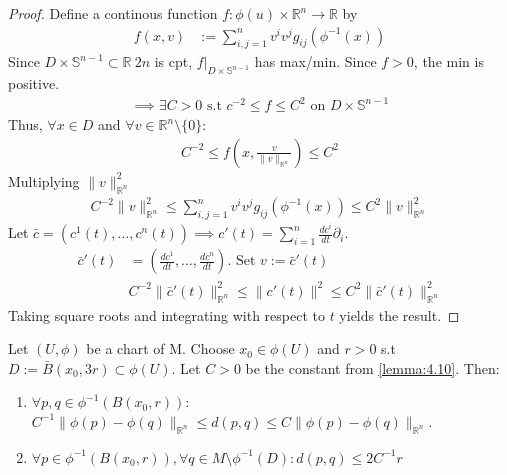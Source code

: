 \begin{proof}
    Define a continous function $f: \phi(u) \times \mathbb{R}^n \rightarrow \mathbb{R}$ by
    \[
    \begin{aligned}
        f(x,v) &:= \sum_{i,j = 1}^n v^i v^j g_{ij} (\phi^{-1}(x))
    \end{aligned}
    \]
    Since $D\times \mathbb{S}^{n-1} \subset \mathbb{R}~{2n}$ is cpt, $f|_{D \times \mathbb{S}^{n-1}}$ has max/min. Since $f>0$, the min is positive.
    \[
    \begin{aligned}
        \implies \exists C>0 \text{ s.t } c^{-2} \leq f \leq C^2 \text{ on } D \times \mathbb{S}^{n-1}
    \end{aligned}
    \]
    Thus, $\forall x \in D$ and $\forall v \in \mathbb{R}^n \setminus \{0\}:$
    \[
    \begin{aligned}
        C^{-2} \leq f\left(x, \frac{v}{\|v\|_{\mathbb{R}^n}} \right) \leq C^2
    \end{aligned}
    \]
    Multiplying $\|v\|^2_{\mathbb{R}^n}$
    \[
    \begin{aligned}
        C^{-2} \|v\|_{\mathbb{R}^n}^2 \leq \sum^n_{i,j=1} v^i v^j g_{ij}(\phi^{-1}(x)) \leq C^2 \|v\|_{\mathbb{R}^n}^2
    \end{aligned}
    \]
    Let $\bar{c} = \left(c^1(t), \dots, c^n(t)\right) \implies c'(t) = \sum^n_{i=1} \frac{dc^i}{dt} \partial_i$.
    \[
    \begin{aligned}
        \bar{c}'(t) &= \left(\frac{dc^1}{dt}, \dots, \frac{dc^n}{dt} \right). \text{ Set } v := \bar{c}'(t) \\
        &C^{-2} \| \bar{c}'(t)\|_{\mathbb{R}^n}^2 \leq \|c'(t)\|^2 \leq C^2 \|\bar{c}'(t)\|_{\mathbb{R}^n}^2
    \end{aligned}
    \]
    Taking square roots and integrating with respect to $t$ yields the result.
\end{proof}

\begin{lemma}\label{lemma:4.11}
    Let $(U, \phi)$ be a chart of M.
    Choose $x_0 \in \phi(U)$ and $r>0$ s.t $D := \bar{B}(x_0, 3r) \subset \phi(U)$.
    Let $C>0$ be the constant from \autoref{lemma:4.10}. Then:
    \begin{enumerate}[label=(\roman*), ref=Lemma \thelemma~(\roman*)]
        \item $\forall p,q \in \phi^{-1}({B}(x_0, r))$: \\
        $C^{-1} \| \phi(p) - \phi(q) \|_{\mathbb{R}^n} \leq d(p,q) \leq C \|\phi(p) - \phi(q)\|_{\mathbb{R}^n}$.
        \item $\forall p \in \phi^{-1}({B}(x_0, r)), \forall q \in M \setminus \phi^{-1}(D) : d(p,q) \leq 2C^{-1}r$
    \end{enumerate}
\end{lemma}

